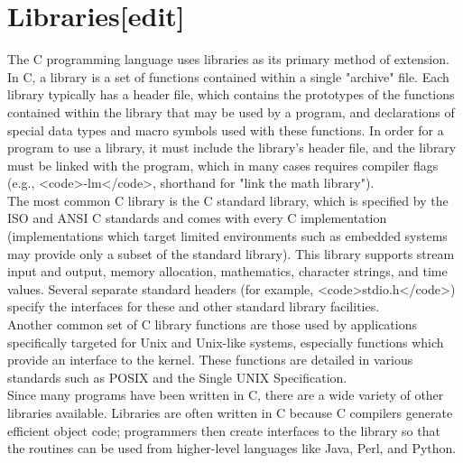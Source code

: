 \documentclass{article}\usepackage{titlesec}
\begin{document}
\section{Libraries[edit]}
The C programming language uses libraries as its primary method of extension. In C, a library is a set of functions contained within a single "archive" file.  Each library typically has a header file, which contains the prototypes of the functions contained within the library that may be used by a program, and declarations of special data types and macro symbols used with these functions. In order for a program to use a library, it must include the library's header file, and the library must be linked with the program, which in many cases requires compiler flags (e.g., <code>-lm</code>, shorthand for "link the math library").
\\
The most common C library is the C standard library, which is specified by the ISO and ANSI C standards and comes with every C implementation (implementations which target limited environments such as embedded systems may provide only a subset of the standard library). This library supports stream input and output, memory allocation, mathematics, character strings, and time values.  Several separate standard headers (for example, <code>stdio.h</code>) specify the interfaces for these and other standard library facilities.
\\
Another common set of C library functions are those used by applications specifically targeted for Unix and Unix-like systems, especially functions which provide an interface to the kernel. These functions are detailed in various standards such as POSIX and the Single UNIX Specification.
\\
Since many programs have been written in C, there are a wide variety of other libraries available. Libraries are often written in C because C compilers generate efficient object code; programmers then create interfaces to the library so that the routines can be used from higher-level languages like Java, Perl, and Python.
\\
\end{document}
